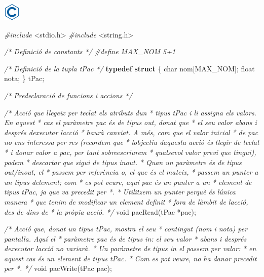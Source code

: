 \documentclass[]{book}
\newenvironment{Shaded}{\begin{snugshade}}{\end{snugshade}}
\newcommand{\CommentTok}[1]{\textcolor[rgb]{0.56,0.35,0.01}{\textit{#1}}}
\newcommand{\DataTypeTok}[1]{\textcolor[rgb]{0.13,0.29,0.53}{#1}}
\newcommand{\ImportTok}[1]{#1}
\newcommand{\KeywordTok}[1]{\textcolor[rgb]{0.13,0.29,0.53}{\textbf{#1}}}
\newcommand{\NormalTok}[1]{#1}
\newcommand{\PreprocessorTok}[1]{\textcolor[rgb]{0.56,0.35,0.01}{\textit{#1}}}
\begin{document}
\includegraphics{./img/c.png}

\begin{Shaded}
\begin{Highlighting}[]
\PreprocessorTok{\#include }\ImportTok{\textless{}stdio.h\textgreater{}}
\PreprocessorTok{\#include }\ImportTok{\textless{}string.h\textgreater{}}

\CommentTok{/* Definició de constants */}
\PreprocessorTok{\#define MAX\_NOM 5+1}

\CommentTok{/* Definició de la tupla tPac */}
\KeywordTok{typedef} \KeywordTok{struct}\NormalTok{ \{}
    \DataTypeTok{char}\NormalTok{ nom[MAX\_NOM];}
    \DataTypeTok{float}\NormalTok{ nota;}
\NormalTok{\} tPac;}

\CommentTok{/* Predeclaració de funcions i accions */}

\CommentTok{/* Acció que llegeix per teclat els atributs d\textquotesingle{}un }
\CommentTok{ * tipus tPac i li assigna els valors. En aquest}
\CommentTok{ * cas el paràmetre pac és de tipus \textquotesingle{}out\textquotesingle{}, donat que }
\CommentTok{ * el seu valor abans i després d\textquotesingle{}executar l\textquotesingle{}acció}
\CommentTok{ * haurà canviat. A més, com que el valor inicial}
\CommentTok{ * de pac no ens interessa per res (recordem que}
\CommentTok{ * l\textquotesingle{}objectiu d\textquotesingle{}aquesta acció és llegir de teclat}
\CommentTok{ * i donar valor a pac, per tant sobreescriurem }
\CommentTok{ * qualsevol valor previ que tingui), podem }
\CommentTok{ * descartar que sigui de tipus \textquotesingle{}inout\textquotesingle{}.}
\CommentTok{ * Quan un paràmetre és de tipus out/inout, el }
\CommentTok{ * passem per referència o, el que és el mateix,}
\CommentTok{ * passem un punter a un tipus d\textquotesingle{}element; com }
\CommentTok{ * es pot veure, aquí pac és un punter a un }
\CommentTok{ * element de tipus tPac, ja que va precedit per *.}
\CommentTok{ * Utilitzem un punter perquè és l\textquotesingle{}única manera}
\CommentTok{ * que tenim de modificar un element definit}
\CommentTok{ * fora de l\textquotesingle{}àmbit de l\textquotesingle{}acció, des de dins de }
\CommentTok{ * la pròpia acció.}
\CommentTok{ */}
\DataTypeTok{void}\NormalTok{ pacRead(tPac *pac);}

\CommentTok{/* Acció que, donat un tipus tPac, mostra el seu }
\CommentTok{ * contingut (nom i nota) per pantalla. Aquí el }
\CommentTok{ * paràmetre pac és de tipus \textquotesingle{}in\textquotesingle{}: el seu valor}
\CommentTok{ * abans i després d\textquotesingle{}executar l\textquotesingle{}acció no variarà.}
\CommentTok{ * Un paràmetre de tipus \textquotesingle{}in\textquotesingle{} el passem per valor: }
\CommentTok{ * en aquest cas és un element de tipus tPac. }
\CommentTok{ * Com es pot veure, no ha d\textquotesingle{}anar precedit per *.}
\CommentTok{ */}
\DataTypeTok{void}\NormalTok{ pacWrite(tPac pac);}


\end{Highlighting}
\end{Shaded}
\end{document}
